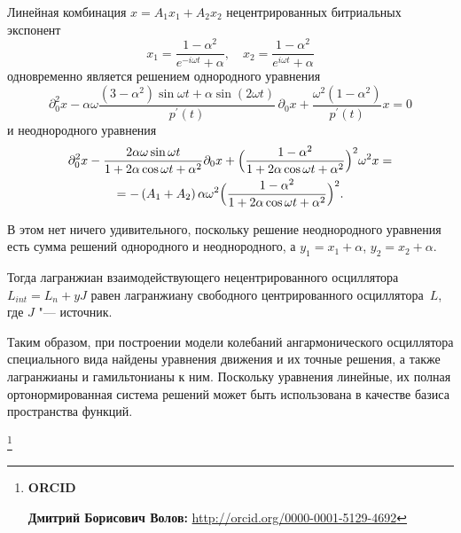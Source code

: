 Линейная комбинация $x=A_{1}x_{1}+A_{2}x_{2}$ нецентрированных битриальных
экспонент 
\[
x_{1}=\dfrac{1-\alpha^{2}}{e^{-i\omega t}+\alpha}, \quad  x_{2}=\dfrac{1-\alpha^{2}}{e^{i\omega t}+\alpha}
\]
 одновременно является решением однородного уравнения 
\begin{equation}
\partial_{0}^{2}x-\alpha\omega\dfrac{\left(3-\alpha^{2}\right)\sin\omega t+\alpha\sin (2\omega t) }{ p^{\prime}(t)}\,\partial_{0}x+\dfrac{\omega^{2}\left(1-\alpha^{2}\right)}{p^{\prime}(t)} x=0
\label{eq:volovdm:3homo-noncenter}
\end{equation}
и неоднородного уравнения
\begin{multline}
\label{eq:volovdm:non-homocenter-eq}
\partial_{0}^{2}x-\dfrac{2\alpha\omega\sin\omega t}{1+2\alpha\cos\omega t+\alpha^{2}}
\partial_{0}x+
\Bigl(\dfrac{1-\alpha^{2}}{1+2\alpha\cos\omega t+\alpha^{2}}\Bigr)^{2}\omega^{2}x =\\
=-\left(A_{1}+A_{2}\right)\alpha\omega^{2}\Bigl(\dfrac{1-\alpha^{2}}{1+2\alpha\cos\omega t+\alpha^{2}}\Bigr)^{2}.
\end{multline}


В этом нет ничего удивительного, поскольку решение неоднородного уравнения
есть сумма решений однородного и неоднородного, а $y_{1}=x_{1}+\alpha$, \mbox{$y_{2}=x_{2}+\alpha$.} 

Тогда лагранжиан взаимодействующего нецентрированного осциллятора $L_{int}=L_{n}+yJ$ равен лагранжиану свободного центрированного осциллятора~$L$, где $J$ "--- источник.

\smallskip

Таким образом, при построении модели колебаний ангармонического осциллятора
специального вида найдены уравнения движения и их точные решения,
а также лагранжианы и гамильтонианы к ним. Поскольку уравнения линейные,
их полная ортонормированная система решений может быть использована
в качестве базиса пространства функций. 



\thanks{{\bf ORCID}

{\bf Дмитрий Борисович Волов:}    \url{http://orcid.org/0000-0001-5129-4692}


}

\RusRef


